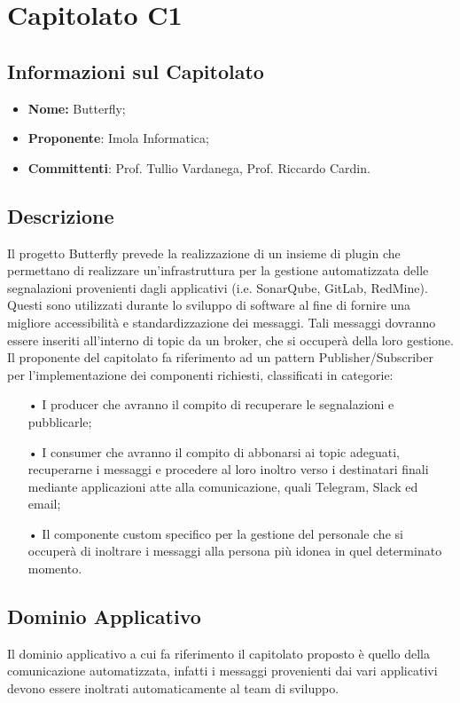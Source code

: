 \section{Capitolato C1}
\subsection{Informazioni sul Capitolato}
\begin{itemize}
	\item \textbf{Nome:} Butterfly;
	\item \textbf{Proponente}: Imola Informatica;
	\item \textbf{Committenti}: Prof. Tullio Vardanega, Prof. Riccardo Cardin.
\end{itemize}

\subsection{Descrizione}
Il progetto Butterfly prevede la realizzazione di un insieme di plugin che permettano di realizzare un'infrastruttura per la gestione automatizzata delle segnalazioni provenienti dagli applicativi (i.e. SonarQube, GitLab, RedMine). Questi sono utilizzati durante lo sviluppo di software al fine di fornire una migliore accessibilità e standardizzazione dei messaggi. Tali messaggi dovranno essere inseriti all'interno di topic da un broker, che si occuperà della loro gestione. Il proponente del capitolato fa riferimento ad un pattern Publisher/Subscriber per l'implementazione dei componenti richiesti, classificati in categorie:
\begin{itemize}
\item[•]I producer che avranno il compito di recuperare le segnalazioni e pubblicarle;
\item[•] I consumer che avranno il compito di abbonarsi ai topic adeguati, recuperarne i messaggi e procedere al loro inoltro verso i destinatari finali mediante applicazioni atte alla comunicazione, quali Telegram, Slack ed email;
\item[•]Il componente custom specifico per la gestione del personale che si occuperà di inoltrare i messaggi alla persona più idonea in quel determinato momento.
\end{itemize}
\subsection{Dominio Applicativo}
Il dominio applicativo a cui fa riferimento il capitolato proposto è quello della comunicazione automatizzata, infatti i messaggi provenienti dai vari applicativi devono essere inoltrati automaticamente al team di sviluppo.
